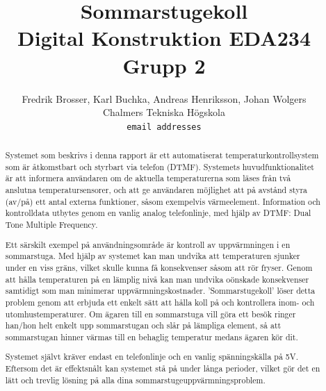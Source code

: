 \documentclass[a4paper,11pt]{article}
\begin{document}
\title{Sommarstugekoll \\
	Digital Konstruktion EDA234 \\ Grupp 2}
\author{Fredrik Brosser, Karl Buchka, Andreas Henriksson, Johan Wolgers \\
   Chalmers Tekniska Högskola \\
   \texttt{email addresses}}

\maketitle

\pagebreak

\tableofcontents

\pagebreak

\begin{abstract}

	Systemet som beskrivs i denna rapport är ett automatiserat temperaturkontrollsystem som är åtkomstbart och styrbart via
	telefon (DTMF). Systemets huvudfunktionalitet är att informera användaren om de aktuella temperaturerna som läses från
	två anslutna temperatursensorer, och att ge användaren möjlighet att på avstånd styra (av/på) ett antal externa funktioner,
	såsom exempelvis värmeelement. Information och kontrolldata utbytes genom en vanlig analog telefonlinje, med hjälp av DTMF:
	Dual Tone Multiple Frequency. 

	Ett särskilt exempel på användningsområde är kontroll av uppvärmningen i en sommarstuga. Med hjälp av systemet kan man
	undvika att temperaturen sjunker under en viss gräns, vilket skulle kunna få konsekvenser såsom att rör fryser. Genom att
	hålla temperaturen på en lämplig nivå kan man undvika oönskade konsekvenser samtidigt som man minimerar uppvärmningskostnader.
	'Sommarstugekoll' löser detta problem genom att erbjuda ett enkelt sätt att hålla koll på och kontrollera inom- och utomhustemperaturer.
	Om ägaren till en sommarstuga vill göra ett besök ringer han/hon helt enkelt upp sommarstugan och slår på lämpliga element, så att
	sommarstugan hinner värmas till en behaglig temperatur medans ägaren kör dit.

	Systemet självt kräver endast en telefonlinje och en vanlig spänningskälla på 5V. Eftersom det är effektsnålt kan systemet stå
	på under långa perioder, vilket gör det en lätt och trevlig lösning på alla dina sommarstugeuppvärmningsproblem.

\end{abstract}

\pagebreak
\end{document}
